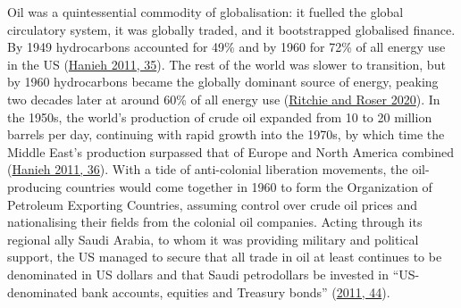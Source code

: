 \documentclass[a4paper, nobind]{templates/ociamthesis}
\begin{document}
Oil was a quintessential commodity of globalisation: it fuelled the global circulatory system, it was globally traded, and it bootstrapped globalised finance. By 1949 hydrocarbons accounted for 49\% and by 1960 for 72\% of all energy use in the US (\protect\hyperlink{ref-hanieh_capitalism_2011}{Hanieh 2011, 35}). The rest of the world was slower to transition, but by 1960 hydrocarbons became the globally dominant source of energy, peaking two decades later at around 60\% of all energy use (\protect\hyperlink{ref-ritchie_energy_2020}{Ritchie and Roser 2020}). In the 1950s, the world's production of crude oil expanded from 10 to 20 million barrels per day, continuing with rapid growth into the 1970s, by which time the Middle East's production surpassed that of Europe and North America combined (\protect\hyperlink{ref-hanieh_capitalism_2011}{Hanieh 2011, 36}). With a tide of anti-colonial liberation movements, the oil-producing countries would come together in 1960 to form the Organization of Petroleum Exporting Countries, assuming control over crude oil prices and nationalising their fields from the colonial oil companies. Acting through its regional ally Saudi Arabia, to whom it was providing military and political support, the US managed to secure that all trade in oil at least continues to be denominated in US dollars and that Saudi petrodollars be invested in ``US-denominated bank accounts, equities and Treasury bonds'' (\protect\hyperlink{ref-hanieh_capitalism_2011}{2011, 44}).
\end{document}
